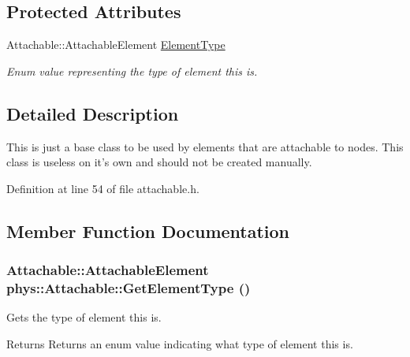 \subsection*{Protected Attributes}
\begin{DoxyCompactItemize}
\item 
\hypertarget{classphys_1_1Attachable_af574d5f08a304c6e0ae002bb2fc057c7}{
Attachable::AttachableElement \hyperlink{classphys_1_1Attachable_af574d5f08a304c6e0ae002bb2fc057c7}{ElementType}}
\label{df/dbd/classphys_1_1Attachable_af574d5f08a304c6e0ae002bb2fc057c7}

\begin{DoxyCompactList}\small\item\em Enum value representing the type of element this is. \item\end{DoxyCompactList}\end{DoxyCompactItemize}


\subsection{Detailed Description}
This is just a base class to be used by elements that are attachable to nodes. This class is useless on it's own and should not be created manually. 

Definition at line 54 of file attachable.h.



\subsection{Member Function Documentation}
\hypertarget{classphys_1_1Attachable_a5f747000367afd85dfaff3a37976e74c}{
\subsubsection[{GetElementType}]{\setlength{\rightskip}{0pt plus 5cm}Attachable::AttachableElement phys::Attachable::GetElementType ()}}
\label{df/dbd/classphys_1_1Attachable_a5f747000367afd85dfaff3a37976e74c}


Gets the type of element this is. 

\begin{DoxyReturn}{Returns}
Returns an enum value indicating what type of element this is. 
\end{DoxyReturn}


